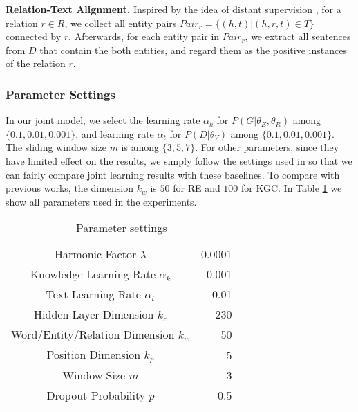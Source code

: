 \documentclass[letterpaper]{article} %
\begin{document}
\textbf{Relation-Text Alignment.} Inspired by the idea of distant supervision \cite{min2013distant}, for a relation $r \in R$, we collect all entity pairs $Pair_{r} = \{(h, t) | (h, r, t) \in T \}$ connected by $r$. Afterwards, for each entity pair in $Pair_{r}$, we extract all sentences from $D$ that contain the both entities, and regard them as the positive instances of the relation $r$. 




\subsubsection{Parameter Settings}

In our joint model, we select the learning rate $\alpha_k$ for $P(G|{\theta_E,\theta_R})$ among $\{0.1, 0.01, 0.001\}$, and learning rate $\alpha_t$ for $P(D|{\theta_V})$ among $\{0.1, 0.01, 0.001\}$. The sliding window size $m$ is among $\{3,5,7\}$. For other parameters, since they have limited effect on the results, we simply follow the settings used in \cite{zeng2014relation,lin2016neural} so that we can fairly compare joint learning results with these baselines. To compare with previous works, the dimension $k_w$ is $50$ for RE and $100$ for KGC. In Table \ref{parameters} we show all parameters used in the experiments.


\begin{table}[htb]
\centering
\small
\label{my-label}
\begin{tabular}{|cr|}
\hline
\multicolumn{1}{|c|}{Harmonic Factor $\lambda$}                & 0.0001 \\
\multicolumn{1}{|c|}{Knowledge Learning Rate $\alpha_k$}        & 0.001 \\
\multicolumn{1}{|c|}{Text Learning Rate $\alpha_t$}             & 0.01  \\
\multicolumn{1}{|c|}{Hidden Layer Dimension $k_c$}        & 230   \\
\multicolumn{1}{|c|}{Word/Entity/Relation Dimension $k_w$} & 50    \\
\multicolumn{1}{|c|}{Position Dimension $k_p$}            & 5     \\
\multicolumn{1}{|c|}{Window Size $m$}    & 3     \\
\multicolumn{1}{|c|}{Dropout Probability $p$}            & 0.5  \\
\hline
\end{tabular}
\caption{Parameter settings}
\label{parameters}
\end{table}
\end{document}
